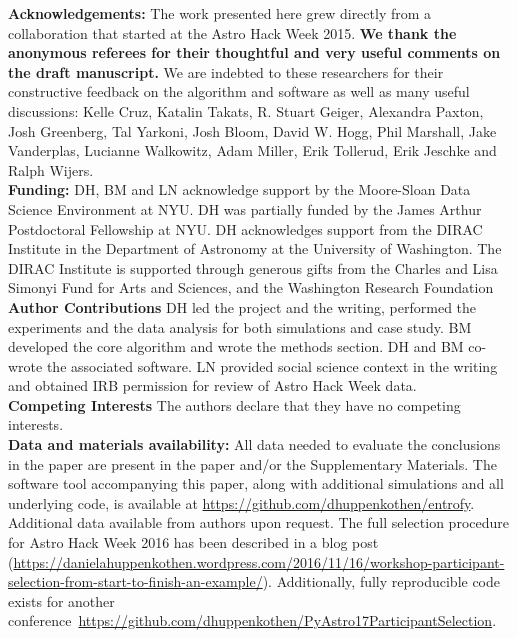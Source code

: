 \documentclass[12pt]{article}
\begin{document}
\noindent \textbf{Acknowledgements:} 
%
The work presented here grew directly from a collaboration that started at the Astro Hack Week 2015. \textbf{We thank the anonymous referees for their thoughtful and very useful comments on the draft manuscript.} We are indebted to these researchers for their constructive feedback on the algorithm and software as well as many useful discussions: Kelle Cruz, Katalin Takats, R. Stuart Geiger, Alexandra Paxton, Josh Greenberg, Tal Yarkoni, Josh Bloom, David W. Hogg, Phil Marshall, Jake Vanderplas, Lucianne Walkowitz, Adam Miller, Erik Tollerud, Erik Jeschke and Ralph Wijers. \\
\noindent \textbf{Funding:} DH, BM and LN acknowledge support by the Moore-Sloan Data Science Environment at NYU. DH was partially funded by the James Arthur Postdoctoral Fellowship at NYU. DH acknowledges support from the DIRAC Institute in the Department of Astronomy at the University of Washington. The DIRAC Institute is supported through generous gifts from the Charles and Lisa Simonyi Fund for Arts and Sciences, and the Washington Research Foundation\\
\noindent \textbf{Author Contributions} DH led the project and the writing, performed the experiments and the data analysis for both simulations and case study. BM developed the core algorithm and wrote the methods section. DH and BM co-wrote the associated software. LN provided social science context in the writing and obtained IRB permission for review of Astro Hack Week data. \\
\noindent \textbf{Competing Interests} The authors declare that they have no competing interests.\\
\noindent \textbf{Data and materials availability:} All data needed to evaluate the conclusions in the paper are present in the paper and/or the Supplementary Materials. The software tool accompanying this paper, along with additional simulations and all underlying code, is available at \url{https://github.com/dhuppenkothen/entrofy}. Additional data available from authors upon request. The full selection procedure for Astro Hack Week 2016 has been described in a blog post (\url{https://danielahuppenkothen.wordpress.com/2016/11/16/workshop-participant-selection-from-start-to-finish-an-example/}). Additionally, fully reproducible code exists for another conference~\url{https://github.com/dhuppenkothen/PyAstro17ParticipantSelection}.
\end{document}
